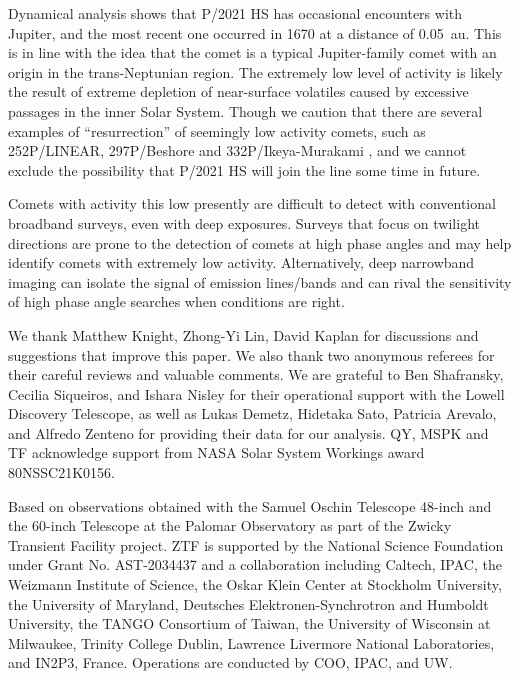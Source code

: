 \documentclass[modern]{aastex631}
\begin{document}
\begin{CJK*}{UTF8}{gbsn}
Dynamical analysis shows that P/2021 HS has occasional encounters with Jupiter, and the most recent one occurred in 1670 at a distance of 0.05~au. This is in line with the idea that the comet is a typical Jupiter-family comet with an origin in the trans-Neptunian region. The extremely low level of activity is likely the result of extreme depletion of near-surface volatiles caused by excessive passages in the inner Solar System. Though we caution that there are several examples of ``resurrection'' of seemingly low activity comets, such as 252P/LINEAR, 297P/Beshore and 332P/Ikeya-Murakami \citep{Li2017,Ye2017}, and we cannot exclude the possibility that P/2021 HS will join the line some time in future.

Comets with activity this low presently are difficult to detect with conventional broadband surveys, even with deep exposures. Surveys that focus on twilight directions \citep[e.g.,][]{Seaman2018, Ye2020} are prone to the detection of comets at high phase angles and may help identify comets with extremely low activity. Alternatively, deep narrowband imaging can isolate the signal of emission lines/bands and can rival the sensitivity of high phase angle searches when conditions are right.

\bigbreak

We thank Matthew Knight, Zhong-Yi Lin, David Kaplan for discussions and suggestions that improve this paper. We also thank two anonymous referees for their careful reviews and valuable comments. We are grateful to Ben Shafransky, Cecilia Siqueiros, and Ishara Nisley for their operational support with the Lowell Discovery Telescope, as well as Lukas Demetz, Hidetaka Sato, Patricia Arevalo, and Alfredo Zenteno for providing their data for our analysis. QY, MSPK and TF acknowledge support from NASA Solar System Workings award 80NSSC21K0156.

Based on observations obtained with the Samuel Oschin Telescope 48-inch and the 60-inch Telescope at the Palomar Observatory as part of the Zwicky Transient Facility project. ZTF is supported by the National Science Foundation under Grant No. AST-2034437 and a collaboration including Caltech, IPAC, the Weizmann Institute of Science, the Oskar Klein Center at Stockholm University, the University of Maryland, Deutsches Elektronen-Synchrotron and Humboldt University, the TANGO Consortium of Taiwan, the University of Wisconsin at Milwaukee, Trinity College Dublin, Lawrence Livermore National Laboratories, and IN2P3, France. Operations are conducted by COO, IPAC, and UW. 


\end{CJK*}
\end{document}
